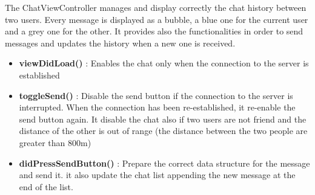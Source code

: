 The ChatViewController manages and display correctly the chat history between two users. Every message is displayed as a bubble, a blue one for the current user and a grey one for the other. It provides also the functionalities in order to send messages and updates the history when a new one is received.

\begin{itemize}

\item \textbf{viewDidLoad()} : Enables the chat only when the connection to the server is established
\item \textbf{toggleSend()} : Disable the send button if the connection to the server is interrupted. When the connection has been re-established, it re-enable the send button again. It disable the chat also if two users are not friend and the distance of the other is out of range (the distance between the two people are greater than 800m)
\item \textbf{didPressSendButton()} : Prepare the correct data structure for the message and send it. it also update the chat list appending the new message at the end of the list.
\end{itemize}

\newpage

